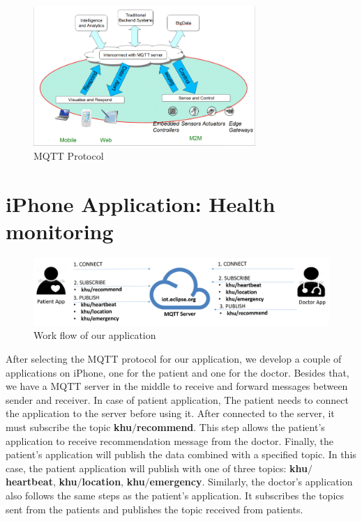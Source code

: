 \begin{figure}[htbp]
\centering
\includegraphics[width=0.75\textwidth]{mqtt.png}
\caption{MQTT Protocol}
\label{fig:mqtt}
\end{figure}

\section{iPhone Application: Health monitoring}

\begin{figure}[htbp]
\centering
\includegraphics[width=1\textwidth]{design.png}
\caption{Work flow of our application}
\label{fig:design}
\end{figure}

After selecting the MQTT protocol for our application, we develop a couple of applications on iPhone, one for the patient and one for the doctor. Besides that, we have a MQTT server in the middle to receive and forward messages between sender and receiver. In case of patient application, The patient needs to connect the application to the server before using it. After connected to the server, it must subscribe the topic \textbf{khu$/$recommend}. This step allows the patient's application to receive recommendation message from the doctor. Finally, the patient's application will publish the data combined with a specified topic. In this case, the patient application will publish with one of three topics: \textbf{khu$/$heartbeat}, \textbf{khu$/$location}, \textbf{khu$/$emergency}. Similarly, the doctor's application also follows the same steps as the patient's application. It subscribes the topics sent from the patients and publishes the topic received from patients.

